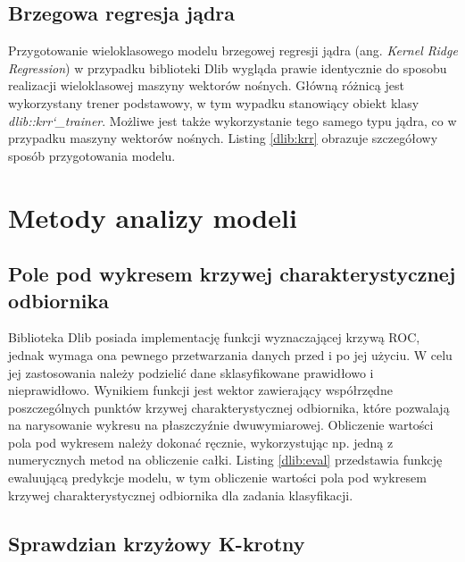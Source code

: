 
\subsection{Brzegowa regresja jądra}

Przygotowanie wieloklasowego modelu brzegowej regresji jądra (ang. \textit{Kernel Ridge Regression}) w przypadku biblioteki Dlib wygląda prawie identycznie do sposobu realizacji wieloklasowej maszyny wektorów nośnych. Główną różnicą jest wykorzystany trener podstawowy, w tym wypadku stanowiący obiekt klasy \textit{dlib::krr\char`_trainer}. Możliwe jest także wykorzystanie tego samego typu jądra, co w przypadku maszyny wektorów nośnych. Listing \ref{dlib:krr} obrazuje szczegółowy sposób przygotowania modelu.

\newpage
{}

\section{Metody analizy modeli}

\subsection{Pole pod wykresem krzywej charakterystycznej odbiornika}

Biblioteka Dlib posiada implementację funkcji wyznaczającej krzywą ROC, jednak wymaga ona pewnego przetwarzania danych przed i po jej użyciu. W celu jej zastosowania należy podzielić dane sklasyfikowane prawidłowo i nieprawidłowo. Wynikiem funkcji jest wektor zawierający współrzędne poszczególnych punktów krzywej charakterystycznej odbiornika, które pozwalają na narysowanie wykresu na płaszczyźnie dwuwymiarowej. Obliczenie wartości pola pod wykresem należy dokonać ręcznie, wykorzystując np. jedną z numerycznych metod na obliczenie całki. Listing \ref{dlib:eval} przedstawia funkcję ewaluującą predykcje modelu, w tym obliczenie wartości pola pod wykresem krzywej charakterystycznej odbiornika dla zadania klasyfikacji.


\subsection{Sprawdzian krzyżowy K-krotny}

